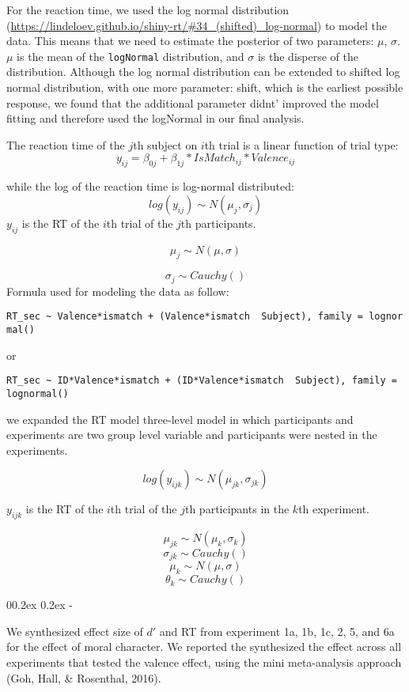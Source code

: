 \documentclass[
  english,
  man]{apa6}
\makeatletter
\let\oldsubparagraph\subparagraph
\renewcommand{\subparagraph}[1]{\oldsubparagraph{#1}\mbox{}}
\renewcommand{\subparagraph}[1]{\@startsection{subparagraph}{5}{1em}%
  {0\baselineskip \@plus 0.2ex \@minus 0.2ex}%
  {-\z@\relax}%
  {\normalfont\normalsize\itshape\hspace{\parindent}{#1}\textit{\addperi}}{\relax}}
\makeatother
\begin{document}
For the reaction time, we used the log normal distribution (\url{https://lindeloev.github.io/shiny-rt/\#34_(shifted)_log-normal}) to model the data. This means that we need to estimate the posterior of two parameters: \(\mu\), \(\sigma\). \(\mu\) is the mean of the \texttt{logNormal} distribution, and \(\sigma\) is the disperse of the distribution. Although the log normal distribution can be extended to shifted log normal distribution, with one more parameter: shift, which is the earliest possible response, we found that the additional parameter didnt' improved the model fitting and therefore used the logNormal in our final analysis.

The reaction time of the \(j\)th subject on \(i\)th trial is a linear function of trial type: \[y_{ij} = \beta_{0j} + \beta_{1j}*IsMatch_{ij} * Valence_{ij}\]

while the log of the reaction time is log-normal distributed:
\[ log(y_{ij}) \sim N(\mu_{j}, \sigma_{j})\]
\(y_{ij}\) is the RT of the \(i\)th trial of the \(j\)th participants.

\[\mu_{j} \sim N(\mu, \sigma)\]

\[\sigma_{j} \sim Cauchy()\]
Formula used for modeling the data as follow:

\texttt{RT\_sec\ \textasciitilde{}\ Valence*ismatch\ +\ (Valence*ismatch\ \textbar{}\ Subject),\ family\ =\ lognormal()}

or

\texttt{RT\_sec\ \textasciitilde{}\ ID*Valence*ismatch\ +\ (ID*Valence*ismatch\ \textbar{}\ Subject),\ family\ =\ lognormal()}

we expanded the RT model three-level model in which participants and experiments are two group level variable and participants were nested in the experiments.

\[ log(y_{ijk}) \sim N(\mu_{jk}, \sigma_{jk})\]

\(y_{ijk}\) is the RT of the \(i\)th trial of the \(j\)th participants in the \(k\)th experiment.

\[\mu_{jk} \sim N(\mu_{k}, \sigma_{k})\]
\[\sigma_{jk} \sim Cauchy()\]
\[\mu_{k} \sim N(\mu, \sigma)\]
\[\theta_{k} \sim Cauchy()\]

\hypertarget{effect-of-moral-character}{%
\subparagraph{Effect of moral character}\label{effect-of-moral-character}}

We synthesized effect size of \(d'\) and RT from experiment 1a, 1b, 1c, 2, 5, and 6a for the effect of moral character. We reported the synthesized the effect across all experiments that tested the valence effect, using the mini meta-analysis approach (Goh, Hall, \& Rosenthal, 2016).
\end{document}
